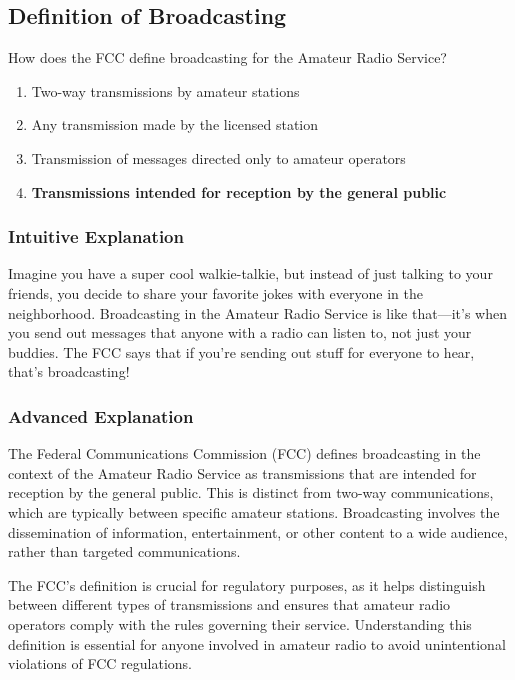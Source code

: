 \subsection{Definition of Broadcasting}
\label{T1D10}

\begin{tcolorbox}[colback=gray!10!white,colframe=black!75!black,title=T1D10]
How does the FCC define broadcasting for the Amateur Radio Service?
\begin{enumerate}[label=\Alph*)]
    \item Two-way transmissions by amateur stations
    \item Any transmission made by the licensed station
    \item Transmission of messages directed only to amateur operators
    \item \textbf{Transmissions intended for reception by the general public}
\end{enumerate}
\end{tcolorbox}

\subsubsection{Intuitive Explanation}
Imagine you have a super cool walkie-talkie, but instead of just talking to your friends, you decide to share your favorite jokes with everyone in the neighborhood. Broadcasting in the Amateur Radio Service is like that—it's when you send out messages that anyone with a radio can listen to, not just your buddies. The FCC says that if you're sending out stuff for everyone to hear, that's broadcasting!

\subsubsection{Advanced Explanation}
The Federal Communications Commission (FCC) defines broadcasting in the context of the Amateur Radio Service as transmissions that are intended for reception by the general public. This is distinct from two-way communications, which are typically between specific amateur stations. Broadcasting involves the dissemination of information, entertainment, or other content to a wide audience, rather than targeted communications. 


The FCC's definition is crucial for regulatory purposes, as it helps distinguish between different types of transmissions and ensures that amateur radio operators comply with the rules governing their service. Understanding this definition is essential for anyone involved in amateur radio to avoid unintentional violations of FCC regulations.


